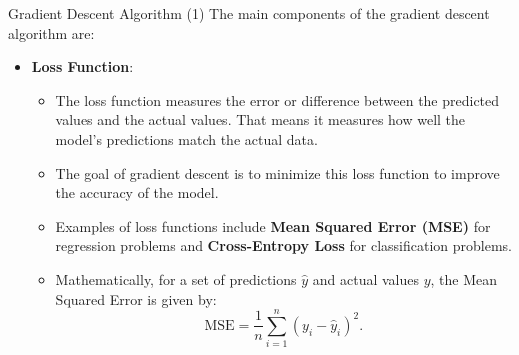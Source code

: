 \documentclass[10pt, hyperref={colorlinks = true,linkcolor = blue}]{beamer}
\begin{document}
{{\begin{frame}{Gradient Descent Algorithm (1)}
  The main components of the gradient descent algorithm are:
\begin{itemize}
    \item \textbf{Loss Function}:
    \begin{itemize}
        \item The loss function measures the error or difference between the predicted values and the actual values. That means it measures how well the model's predictions match the actual data.
        \item The goal of gradient descent is to minimize this loss function to improve the accuracy of the model.
        \item Examples of loss functions include \textbf{Mean Squared Error (MSE)} for regression problems and \textbf{Cross-Entropy Loss} for classification problems.
        \item Mathematically, for a set of predictions \(\hat{y}\) and actual values \(y\), the Mean Squared Error is given by:
        \[
        \text{MSE} = \frac{1}{n} \sum_{i=1}^{n} (y_i - \hat{y}_i)^2.
        \]
\end{itemize}
      \end{itemize}
 \end{frame}
 
}}
\end{document}
